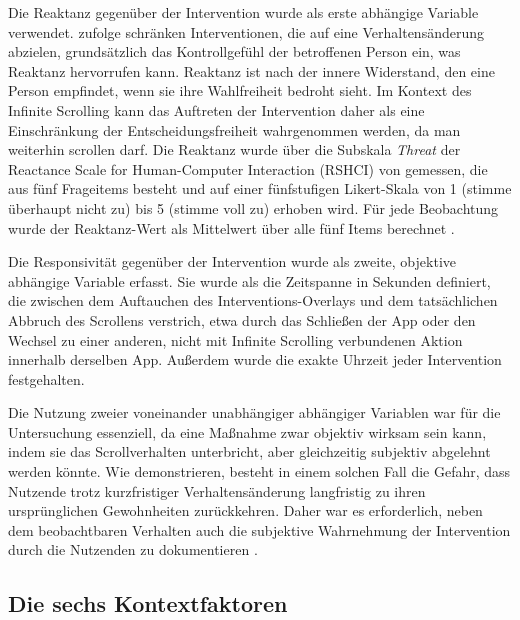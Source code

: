 \documentclass[11pt,a4paper]{article}
\begin{document}
Die Reaktanz gegenüber der Intervention wurde als erste abhängige Variable verwendet.
\citet{rains2013reactance} zufolge schränken Interventionen, die auf eine Verhaltensänderung
abzielen, grundsätzlich das
Kontrollgefühl der betroffenen Person ein, was Reaktanz hervorrufen kann. Reaktanz ist nach
\citet{ehrenbrink2020reactance} der innere Widerstand, den eine Person empfindet, wenn sie ihre Wahlfreiheit
bedroht sieht. Im Kontext des Infinite Scrolling kann das Auftreten der Intervention daher
als eine Einschränkung der Entscheidungsfreiheit wahrgenommen werden, da man weiterhin
scrollen darf. Die Reaktanz wurde über die Subskala \emph{Threat} der Reactance Scale for
Human-Computer Interaction (RSHCI) von \citet{ehrenbrink2020reactance} gemessen, die aus fünf Frageitems besteht
und auf einer fünfstufigen Likert-Skala von 1 (\glqq stimme überhaupt nicht zu\grqq{}) bis 5
(\glqq stimme voll zu\grqq{}) erhoben wird. Für jede Beobachtung wurde der Reaktanz-Wert als
Mittelwert über alle fünf Items berechnet \citep{meinhardt2025scrolling}.

Die Responsivität gegenüber der Intervention wurde als zweite, objektive abhängige Variable
erfasst. Sie wurde als die Zeitspanne in Sekunden definiert, die zwischen dem Auftauchen des
Interventions-Overlays und dem tatsächlichen Abbruch des Scrollens verstrich, etwa durch das
Schließen der App oder den Wechsel zu einer anderen, nicht mit Infinite Scrolling
verbundenen Aktion innerhalb derselben App. Außerdem wurde die exakte Uhrzeit jeder
Intervention festgehalten.

Die Nutzung zweier voneinander unabhängiger abhängiger Variablen war für die Untersuchung
essenziell, da eine Maßnahme zwar objektiv wirksam sein kann, indem sie das Scrollverhalten
unterbricht, aber gleichzeitig subjektiv abgelehnt werden könnte. Wie \citet{okeke2018goodvibrations}
demonstrieren, besteht in einem solchen Fall die Gefahr, dass Nutzende trotz kurzfristiger
Verhaltensänderung langfristig zu ihren ursprünglichen Gewohnheiten zurückkehren. Daher war
es erforderlich, neben dem beobachtbaren Verhalten auch die subjektive Wahrnehmung der
Intervention durch die Nutzenden zu dokumentieren \citep{meinhardt2025scrolling}.

\subsection{Die sechs Kontextfaktoren}
\end{document}
